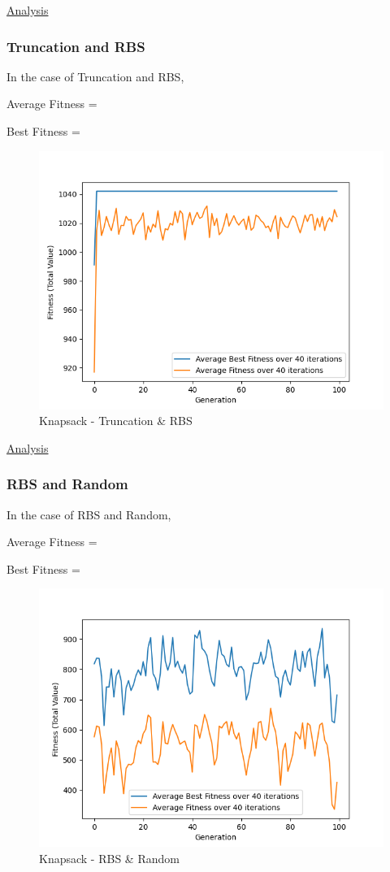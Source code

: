 \documentclass[11pt, letterpaper]{article}
\begin{document}
\underline{Analysis}
\subsubsection {Truncation and RBS}
In the case of Truncation and RBS,

Average Fitness = 

Best Fitness = 
\begin{figure}[H]
    \centering
    \includegraphics[scale = 0.6]{images/knapsack_tr_rb.png}
    \caption {Knapsack - Truncation \& RBS}
    \label {fig:kpTR}
\end{figure}

\underline{Analysis}
\subsubsection {RBS and Random}
In the case of RBS and Random,

Average Fitness = 

Best Fitness = 
\begin{figure}[H]
    \centering
    \includegraphics[scale = 0.6]{images/knapsack_rd_rd.png}
    \caption {Knapsack - RBS \& Random}
    \label {fig:kpRbR}
\end{figure}
\end{document}

